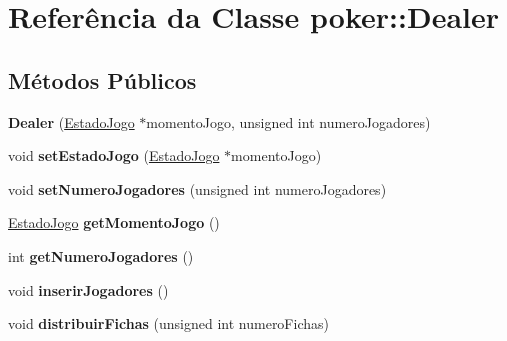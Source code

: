 \hypertarget{classpoker_1_1Dealer}{}\section{Referência da Classe poker\+:\+:Dealer}
\label{classpoker_1_1Dealer}
\subsection*{Métodos Públicos}
\begin{DoxyCompactItemize}
\item 
\mbox{\label{classpoker_1_1Dealer_a54adfca2be5edf2527a0786fd91c435d}} 
{\bfseries Dealer} (\hyperlink{classpoker_1_1EstadoJogo}{Estado\+Jogo} $\ast$momento\+Jogo, unsigned int numero\+Jogadores)
\item 
\mbox{\label{classpoker_1_1Dealer_a80b865273878797a1756947515202ac3}} 
void {\bfseries set\+Estado\+Jogo} (\hyperlink{classpoker_1_1EstadoJogo}{Estado\+Jogo} $\ast$momento\+Jogo)
\item 
\mbox{\label{classpoker_1_1Dealer_a7090c833b8ffb7e96a55fb523b3c05d1}} 
void {\bfseries set\+Numero\+Jogadores} (unsigned int numero\+Jogadores)
\item 
\mbox{\label{classpoker_1_1Dealer_aba00d7423e68261b487bb8828a24d7b4}} 
\hyperlink{classpoker_1_1EstadoJogo}{Estado\+Jogo} {\bfseries get\+Momento\+Jogo} ()
\item 
\mbox{\label{classpoker_1_1Dealer_ac69b2c5fae85cbaea85dff2dde2f58e3}} 
int {\bfseries get\+Numero\+Jogadores} ()
\item 
\mbox{\label{classpoker_1_1Dealer_a794b8ba94d4fc358425d712f2eaa0fe0}} 
void {\bfseries inserir\+Jogadores} ()
\item 
\mbox{\label{classpoker_1_1Dealer_a49b2141c2c11b0e5ba7a66b2ef1daf1c}} 
void {\bfseries distribuir\+Fichas} (unsigned int numero\+Fichas)
\item 
\mbox{\label{classpoker_1_1Dealer_ab1dbdc7c6f58788cce55584fb305a495}} 

\end{DoxyCompactItemize}
